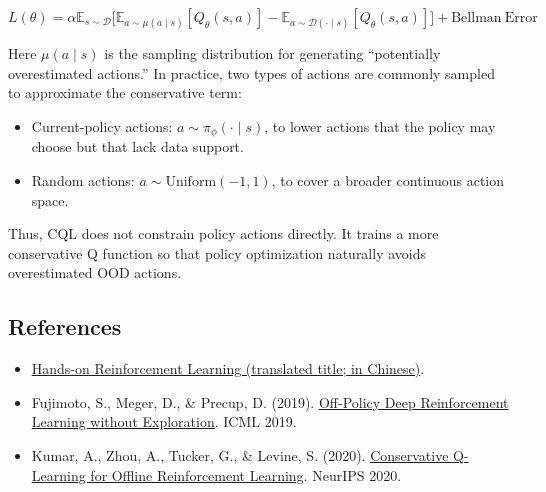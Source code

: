 \[
L(\theta)
=\alpha\mathbb{E}_{s\sim\mathcal D}
\bigl[
\mathbb{E}_{a\sim\mu(a\mid s)}[Q_\theta(s,a)]
-\mathbb{E}_{a\sim\mathcal D(\cdot\mid s)}[Q_\theta(s,a)]
\bigr]
+\mathrm{Bellman\ Error}
\]

Here \(\mu(a\mid s)\) is the sampling distribution for generating ``potentially overestimated actions.'' In practice, two types of actions are commonly sampled to approximate the conservative term:

\begin{itemize}
\tightlist
\item
  Current-policy actions: \(a\sim\pi_\phi(\cdot\mid s)\), to lower actions that the policy may choose but that lack data support.
\item
  Random actions: \(a\sim\mathrm{Uniform}(-1,1)\), to cover a broader continuous action space.
\end{itemize}

Thus, CQL does not constrain policy actions directly. It trains a more conservative Q function so that policy optimization naturally avoids overestimated OOD actions.

\FloatBarrier
{}
\hypertarget{references-64}{%
\subsection{References}\label{references-64}}

\vspace{0.25em}
\begin{itemize}
\tightlist
\item
  \href{https://hrl.boyuai.com/}{Hands-on Reinforcement Learning (translated title; in Chinese)}.
\item
  Fujimoto, S., Meger, D., \& Precup, D. (2019). \href{https://arxiv.org/abs/1812.02900}{Off-Policy Deep Reinforcement Learning without Exploration}. ICML 2019.
\item
  Kumar, A., Zhou, A., Tucker, G., \& Levine, S. (2020). \href{https://arxiv.org/abs/2006.04779}{Conservative Q-Learning for Offline Reinforcement Learning}. NeurIPS 2020.
\end{itemize}

\clearpage
